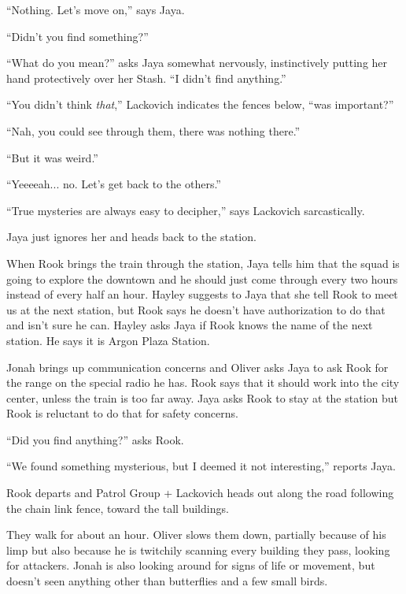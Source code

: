 ``Nothing.  Let's move on,'' says Jaya.

``Didn't you find something?''

``What do you mean?'' asks Jaya somewhat nervously, instinctively putting her hand protectively over her Stash.  ``I didn't find anything.''

``You didn't think \textit{that},'' Lackovich indicates the fences below, ``was important?''

``Nah, you could see through them, there was nothing there.''

``But it was weird.''

``Yeeeeah... no.  Let's get back to the others.''

``True mysteries are always easy to decipher,'' says Lackovich sarcastically.

Jaya just ignores her and heads back to the station.



When Rook brings the train through the station, Jaya tells him that the squad is going to explore the downtown and he should just come through every two hours instead of every half an hour.  Hayley suggests to Jaya that she tell Rook to meet us at the next station, but Rook says he doesn't have authorization to do that and isn't sure he can.  Hayley asks Jaya if Rook knows the name of the next station.  He says it is Argon Plaza Station.



Jonah brings up communication concerns and Oliver asks Jaya to ask Rook for the range on the special radio he has.  Rook says that it should work into the city center, unless the train is too far away.  Jaya asks Rook to stay at the station but Rook is reluctant to do that for safety concerns.

``Did you find anything?'' asks Rook.

``We found something mysterious, but I deemed it not interesting,'' reports Jaya.



Rook departs and Patrol Group + Lackovich heads out along the road following the chain link fence, toward the tall buildings.



They walk for about an hour.  Oliver slows them down, partially because of his limp but also because he is twitchily scanning every building they pass, looking for attackers.  Jonah is also looking around for signs of life or movement, but doesn't seen anything other than butterflies and a few small birds.



